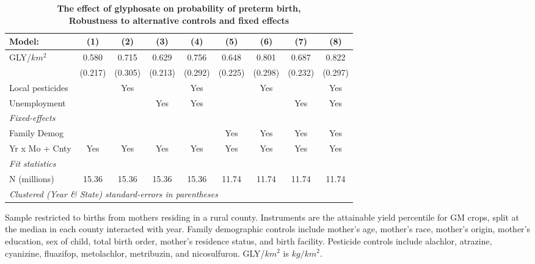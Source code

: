 \begin{table}[htbp]
   \centering
   \small
   \begin{threeparttable}[b]
      \caption{\label{tab:robust-cntrl-i_preterm-allyielddiffgmo500} \textbf{The effect of glyphosate on probability of preterm birth, \\ Robustness to alternative controls and fixed effects}}
      \begin{tabular}{lcccccccc}
         \toprule
         Model:           & (1)     & (2)     & (3)     & (4)     & (5)     & (6)     & (7)     & (8)\\  
         \midrule 
         GLY/$km^2$       & 0.580   & 0.715   & 0.629   & 0.756   & 0.648   & 0.801   & 0.687   & 0.822\\   
                          & (0.217) & (0.305) & (0.213) & (0.292) & (0.225) & (0.298) & (0.232) & (0.297)\\   
         Local pesticides &         & Yes     &         & Yes     &         & Yes     &         & Yes\\  
         Unemployment     &         &         & Yes     & Yes     &         &         & Yes     & Yes\\  
         \midrule
         \emph{Fixed-effects}\\
         Family Demog     &         &         &         &         & Yes     & Yes     & Yes     & Yes\\  
         Yr x Mo + Cnty   & Yes     & Yes     & Yes     & Yes     & Yes     & Yes     & Yes     & Yes\\  
         \midrule
         \emph{Fit statistics}\\
         N (millions)     & 15.36   & 15.36   & 15.36   & 15.36   & 11.74   & 11.74   & 11.74   & 11.74\\  
         \midrule
         \multicolumn{9}{l}{\emph{Clustered (Year \& State) standard-errors in parentheses}}\\
      \end{tabular}
      
      \begin{tablenotes}\item Sample restricted to births from mothers residing in a rural county. Instruments are the attainable yield percentile for GM crops, split at the median in each county interacted with year. Family demographic controls include mother's age, mother's race, mother's origin, mother's education, sex of child, total birth order, mother's residence status, and birth facility. Pesticide controls include alachlor, atrazine, cyanizine, fluazifop, metolachlor, metribuzin, and nicosulfuron. GLY/$km^2$ is $kg/km^2$.
      \end{tablenotes}
   \end{threeparttable}
\end{table}
